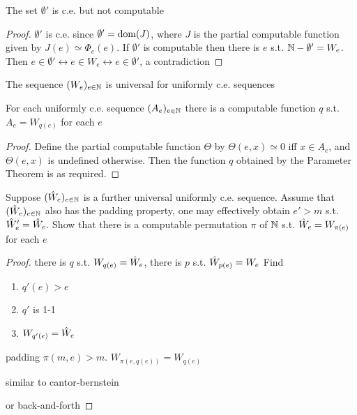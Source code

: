 \documentclass[11pt]{article}
\begin{document}
\begin{proposition}[]
The set \(\emptyset'\) is c.e. but not computable
\end{proposition}

\begin{proof}
\(\emptyset'\) is c.e. since \(\emptyset'=\operatorname{dom}(J)\), where \(J\) is the partial computable function given
by \(J(e)\simeq\Phi_e(e)\). If \(\emptyset'\) is computable then there is \(e\) s.t. \(\mathbb{N}-\emptyset'=W_e\).
Then \(e\in\emptyset'\leftrightarrow e\in W_e\leftrightarrow e\in\emptyset'\), a contradiction
\end{proof}

The sequence \((W_e)_{e\in\mathbb{N}}\) is universal for uniformly c.e. sequences

\begin{corollary}[]
For each uniformly c.e. sequence \((A_e)_{e\in\mathbb{N}}\) there is a computable function \(q\)
s.t. \(A_e=W_{q(e)}\) for each \(e\)
\end{corollary}

\begin{proof}
Define the partial computable function \(\Theta\) by \(\Theta(e,x)\simeq 0\) iff \(x\in A_e\), and \(\Theta(e,x)\) is
undefined otherwise. Then the function \(q\) obtained by the Parameter Theorem is as required.
\end{proof}

\begin{exercise}
\label{1.1.12}
Suppose \((\hat{W}_e)_{e\in\mathbb{N}}\) is a further universal uniformly c.e. sequence. Assume
that \((\hat{W}_e)_{e\in\mathbb{N}}\) also has the padding property, one may effectively obtain \(e'>m\)
s.t. \(\hat{W}_e'=\hat{W}_e\). Show that there is a computable permutation \(\pi\) of \(\mathbb{N}\)
s.t. \(\hat{W}_e=W_{\pi(e)}\) for each \(e\)
\end{exercise}

\begin{proof}
there is \(q\) s.t. \(W_{q(e)}=\hat{W}_e\), there is \(p\) s.t. \(\hat{W}_{p(e)}=W_e\)
Find
\begin{enumerate}
\item \(q'(e)>e\)
\item \(q'\) is 1-1
\item \(W_{q'(e)}=\hat{W}_e\)
\end{enumerate}


padding \(\pi(m,e)>m\). \(W_{\pi(e,q(e))}=W_{q(e)}\)

similar to cantor-bernstein

or back-and-forth
\end{proof}
\end{document}
